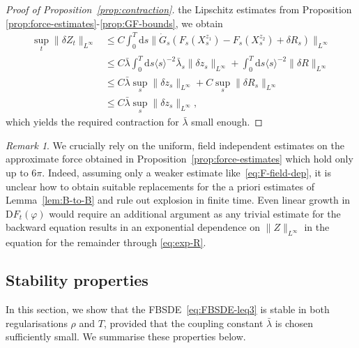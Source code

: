 \documentclass[11pt, a4paper]{scrartcl}
\numberwithin{equation}{section}
\theoremstyle{plain}
\theoremstyle{remark}
\newtheorem{remark}[foo]{Remark}
\newcommand{\mathD}{\mathrm{D}}
\newcommand{\mathd}{\mathrm{d}}
\begin{document}
\begin{proof}[Proof of Proposition~\ref{prop:contraction}]
	the Lipschitz estimates from Proposition
	\ref{prop:force-estimates}-\ref{prop:GF-bounds}, we obtain
	\[ \begin{aligned}
			\sup_t \| \delta Z_t \|_{L^{\infty}} & \leqslant  C \int_0^T \mathd s
			\| \dot{G}_s (F_s (X^{z_1}_s) - F_s (X^{z_2}_s) + \delta R_s)
			\|_{L^{\infty}}                                                                                             \\
			                                     & \leqslant  C \bar{\lambda} \int_0^T \mathd s \langle s \rangle^{- 2}
			\bar{\lambda}_s \| \delta z_s \|_{L^{\infty}} + \int_0^T \mathd s \langle s
			\rangle^{- 2} \| \delta R \|_{L^{\infty}}                                                                   \\
			                                     & \leqslant  C \bar{\lambda} \sup_s \| \delta z_s \|_{L^{\infty}} + C
			\sup_s \| \delta R_s \|_{L^{\infty}}                                                                        \\
			                                     & \leqslant  C \bar{\lambda} \sup_s \| \delta z_s \|_{L^{\infty}},
		\end{aligned} \]
	which yields the required contraction for $\bar{\lambda}$ small enough.
\end{proof}

\begin{remark}
	\label{rem:FBSDE-6p}We crucially rely on the uniform, field independent
	estimates on the approximate force obtained in
	Proposition~\ref{prop:force-estimates} which hold only up to $6 \pi$.
	Indeed, assuming only a weaker estimate like~\eqref{eq:F-field-dep}, it is
	unclear how to obtain suitable replacements for the a priori estimates of
	Lemma~\ref{lem:B-to-B} and rule out explosion in finite time. Even linear
	growth in $\mathD F_t (\varphi)$ would require an additional argument as any
	trivial estimate for the backward equation results in an exponential
	dependence on $\| Z \|_{L^{\infty}}$ in the equation for the remainder
	through \eqref{eq:exp-R}.
\end{remark}

\subsection{Stability properties}

In this section, we show that the FBSDE~\eqref{eq:FBSDE-leq3} is stable in both regularisations $\rho$ and $T$,
provided that the coupling constant $\bar{\lambda}$ is chosen sufficiently small. We
summarise these properties below.
\end{document}
